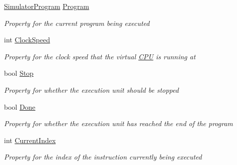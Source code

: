 \begin{DoxyCompactItemize}
\item 
\hyperlink{class_c_p_u___o_s___simulator_1_1_c_p_u_1_1_simulator_program}{Simulator\+Program} \hyperlink{class_c_p_u___o_s___simulator_1_1_c_p_u_1_1_execution_unit_a5266ac137491de1efa6c4d707fcd162e}{Program}
\begin{DoxyCompactList}\small\item\em Property for the current program being executed \end{DoxyCompactList}\item 
int \hyperlink{class_c_p_u___o_s___simulator_1_1_c_p_u_1_1_execution_unit_ac34a0c232ee8d1996d29f5d8614556ab}{Clock\+Speed}
\begin{DoxyCompactList}\small\item\em Property for the clock speed that the virtual \hyperlink{namespace_c_p_u___o_s___simulator_1_1_c_p_u}{C\+P\+U} is running at \end{DoxyCompactList}\item 
bool \hyperlink{class_c_p_u___o_s___simulator_1_1_c_p_u_1_1_execution_unit_a1b8748f1c6679263e5dc03fe382ad150}{Stop}
\begin{DoxyCompactList}\small\item\em Property for whether the execution unit should be stopped \end{DoxyCompactList}\item 
bool \hyperlink{class_c_p_u___o_s___simulator_1_1_c_p_u_1_1_execution_unit_afc47977290c9bccf4f3b115613a67576}{Done}
\begin{DoxyCompactList}\small\item\em Property for whether the execution unit has reached the end of the program \end{DoxyCompactList}\item 
int \hyperlink{class_c_p_u___o_s___simulator_1_1_c_p_u_1_1_execution_unit_a14d2a23bdc679ed2758733f34f79db63}{Current\+Index}
\begin{DoxyCompactList}\small\item\em Property for the index of the instruction currently being executed \end{DoxyCompactList}\item 

\end{DoxyCompactItemize}
